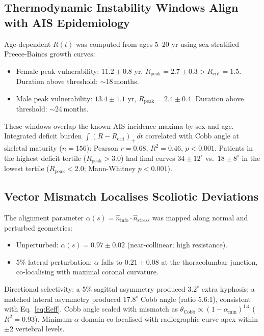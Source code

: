\documentclass[12pt, letterpaper]{article}
\begin{document}
\subsection{Thermodynamic Instability Windows Align with AIS Epidemiology}

Age-dependent $R(t)$ was computed from ages 5--20 yr using sex-stratified
Preece-Baines growth curves:

\begin{itemize}
  \item Female peak vulnerability: $11.2\pm0.8$ yr,
    $R_{\mathrm{peak}} = 2.7\pm0.3 > R_{\mathrm{crit}} = 1.5$.
    Duration above threshold: $\sim$18\,months.
  \item Male peak vulnerability: $13.4\pm1.1$ yr,
    $R_{\mathrm{peak}} = 2.4\pm0.4$.
    Duration above threshold: $\sim$24\,months.
\end{itemize}

These windows overlap the known AIS incidence maxima by sex and age.
Integrated deficit burden $\int\!(R - R_{\mathrm{crit}})_+ \, dt$ correlated
with Cobb angle at skeletal maturity ($n=156$): Pearson $r=0.68$,
$R^{2}=0.46$, $p<0.001$. Patients in the highest deficit tertile
($R_{\mathrm{peak}}>3.0$) had final curves $34\pm12^{\circ}$ vs.\
$18\pm8^{\circ}$ in the lowest tertile ($R_{\mathrm{peak}}<2.0$;
Mann-Whitney $p<0.001$).

\subsection{Vector Mismatch Localises Scoliotic Deviations}

The alignment parameter $\alpha(s) = \hat{n}_{\mathrm{info}}\cdot
\hat{n}_{\mathrm{stress}}$ was mapped along normal and perturbed geometries:

\begin{itemize}
  \item Unperturbed: $\alpha(s) = 0.97\pm0.02$ (near-collinear; high resistance).
  \item 5\% lateral perturbation: $\alpha$ falls to $0.21\pm0.08$ at the
    thoracolumbar junction, co-localising with maximal coronal curvature.
\end{itemize}

Directional selectivity: a 5\% sagittal asymmetry produced $3.2^{\circ}$
extra kyphosis; a matched lateral asymmetry produced $17.8^{\circ}$ Cobb angle
(ratio 5.6:1), consistent with Eq.~\eqref{eq:Eeff}. Cobb angle scaled with
mismatch as $\theta_{\mathrm{Cobb}} \propto (1-\alpha_{\min})^{1.4}$
($R^{2}=0.93$). Minimum-$\alpha$ domain co-localised with radiographic curve
apex within $\pm2$ vertebral levels.
\end{document}
